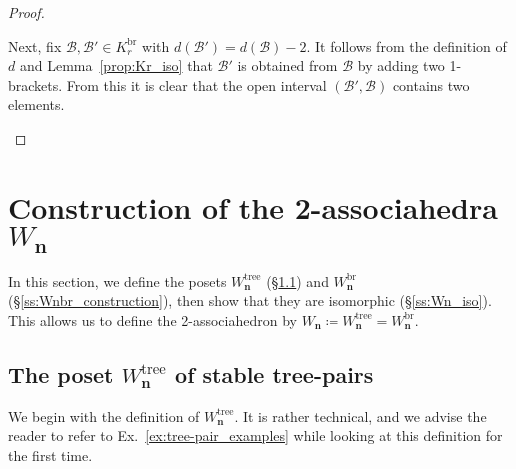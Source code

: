 \documentclass[11pt]{amsart}
\theoremstyle{definition}
\theoremstyle{remark}
\theoremstyle{plain}
\newcommand\bn{\mathbf{n}}
\newcommand{\sB}{\mathscr{B}}
\newcommand{\on}{\operatorname}
\newcommand{\tree}{{\on{tree}}}
\newcommand{\br}{{\on{br}}}
\begin{document}
\begin{proof}
\begin{itemize}
Next, fix $\sB, \sB' \in K_r^\br$ with $d(\sB') = d(\sB) - 2$.
It follows from the definition of $d$ and Lemma~\ref{prop:Kr_iso} that $\sB'$ is obtained from $\sB$ by adding two 1-brackets.
From this it is clear that the open interval $(\sB',\sB)$ contains two elements.
\end{itemize}
\end{proof}

\section{Construction of the 2-associahedra \texorpdfstring{$W_\bn$}{Wn}}
\label{sec:2ass}


In this section, we define the posets $W_\bn^\tree$ (\S\ref{ss:Wntree_construction}) and $W_\bn^\br$ (\S\ref{ss:Wnbr_construction}), then show that they are isomorphic (\S\ref{ss:Wn_iso}).
This allows us to define the 2-associahedron by $W_\bn \coloneqq W_\bn^\tree = W_\bn^\br$.

\subsection{The poset \texorpdfstring{$W_\bn^\tree$}{Wntree} of stable tree-pairs}
\label{ss:Wntree_construction}

We begin with the definition of $W_\bn^\tree$.
It is rather technical, and we advise the reader to refer to Ex.~\ref{ex:tree-pair_examples} while looking at this definition for the first time.
\end{document}
